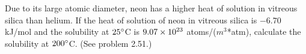 \documentclass[12pt]{article}
\newenvironment{problem}[2][Problem]{\begin{trivlist}
\item[\hskip \labelsep {\bfseries #1}\hskip \labelsep {\bfseries #2.}]}{\end{trivlist}}
\begin{document}
\begin{problem}{2.52}
Due to its large atomic diameter, neon has a higher heat of solution in vitreous silica than helium. If the heat of solution of neon in vitreous silica is $-6.70$ kJ/mol and the solubility at $25\degree$C is $9.07 \times 10^{23}$ atoms/($m^3$*atm), calculate the solubility at $200\degree$C. (See problem 2.51.)
\end{problem}
 
\end{document}

